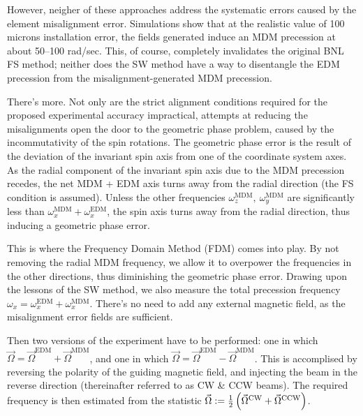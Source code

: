 \documentclass{article}
\newcommand{\W}{\Omega}
\newcommand{\w}{\omega}
\newcommand{\MDM}{^\mathrm{MDM}}
\newcommand{\EDM}{^\mathrm{EDM}}
\newcommand{\CW}{^\mathrm{CW}}
\newcommand{\CCW}{^\mathrm{CCW}}
\begin{document}
However, neigher of these approaches address the systematic errors caused by the element misalignment error. Simulations show that at the realistic value of 100 microns installation error, the fields generated induce an MDM precession at about 50--100 rad/sec. This, of course, completely invalidates the original BNL FS method; neither does the SW method have a way to disentangle the EDM precession from the misalignment-generated MDM precession.

There's more. Not only are the strict alignment conditions required for the proposed experimental accuracy impractical, attempts at reducing the misalignments open the door to the geometric phase problem, caused by the incommutativity of the spin rotations. The geometric phase error is the result of the deviation of the invariant spin axis from one of the coordinate system axes. As the radial component of the invariant spin axis due to the MDM precession recedes, the net MDM + EDM axis turns away from the radial direction (the FS condition is assumed). Unless the other frequencies $\w_z\MDM,~\w_y\MDM$ are significantly less than $\w_x\MDM + \w_x\EDM$, the spin axis turns away from the radial direction, thus inducing a geometric phase error.

This is where the Frequency Domain Method (FDM) comes into play. By not removing the radial MDM frequency, we allow it to overpower the frequencies in the other directions, thus diminishing the geometric phase error. Drawing upon the lessons of the SW method, we also measure the total precession frequency $\w_x = \w_x\EDM + \w_x\MDM$. There's no need to add any external magnetic field, as the misalignment error fields are sufficient.

Then two versions of the experiment have to be performed: one in which $\vec\W = \vec\W\EDM + \vec\W\MDM$, and one in which $\vec\W = \vec\W\EDM - \vec\W\MDM$. This is accomplised by reversing the polarity of the guiding magnetic field, and injecting the beam in the reverse direction (thereinafter referred to as CW \& CCW beams). The required frequency is then estimated from the statistic $\vec\W := \frac12\bkt{\vec\W\CW + \vec\W\CCW}$.
\end{document}
